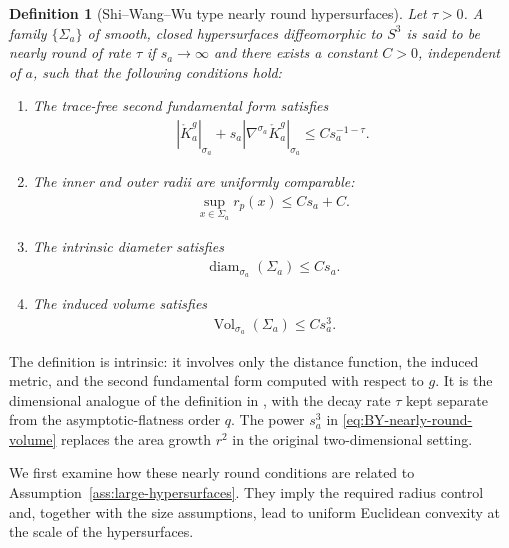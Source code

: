 \documentclass[10pt]{amsart}
\theoremstyle{plain}
\newtheorem{definition}[theorem]{Definition}
\theoremstyle{remark}
\begin{document}
	\begin{definition}[Shi--Wang--Wu type nearly round hypersurfaces]
		\label{def:BY-AF-nearly-round}
		Let $\tau>0$. A family $\{\Sigma_a\}$ of smooth, closed
		hypersurfaces diffeomorphic to $S^3$ is said to be nearly round of
		rate $\tau$ if $s_a\to\infty$ and there exists a constant $C>0$,
		independent of $a$, such that the following conditions hold:
		\begin{enumerate}[label=\textup{(\roman*)}]
			\item The trace-free second fundamental form satisfies
			\begin{align}\label{eq:BY-nearly-round-tracefree}
				\left|\mathring K_a^g\right|_{\sigma_a}
				+
				s_a
				\left|
				\nabla^{\sigma_a}\mathring K_a^g
				\right|_{\sigma_a}
				\leq
				Cs_a^{-1-\tau}.
			\end{align}
			
			\item The inner and outer radii are uniformly comparable:
			\begin{align}\label{eq:BY-nearly-round-radius}
				\sup_{x\in\Sigma_a}r_p(x)
				\leq
				Cs_a+C.
			\end{align}
			
			\item The intrinsic diameter satisfies
			\begin{align}\label{eq:BY-nearly-round-diameter}
				\operatorname{diam}_{\sigma_a}(\Sigma_a)
				\leq
				Cs_a.
			\end{align}
			
			\item The induced volume satisfies
			\begin{align}\label{eq:BY-nearly-round-volume}
				\operatorname{Vol}_{\sigma_a}(\Sigma_a)
				\leq
				Cs_a^3.
			\end{align}
		\end{enumerate}
	\end{definition}
	
	The definition is intrinsic: it involves only the distance function,
	the induced metric, and the second fundamental form computed with
	respect to $g$. It is the dimensional analogue of the definition in
	\cite{ShiWangWu}, with the decay rate $\tau$ kept separate from the
	asymptotic-flatness order $q$. The power $s_a^3$ in
	\eqref{eq:BY-nearly-round-volume} replaces the area growth $r^2$ in
	the original two-dimensional setting.
	
	We first examine how these nearly round conditions are related to
	Assumption~\ref{ass:large-hypersurfaces}. They imply the required radius
	control and, together with the size assumptions, lead to uniform
	Euclidean convexity at the scale of the hypersurfaces. 
	
\end{document}
